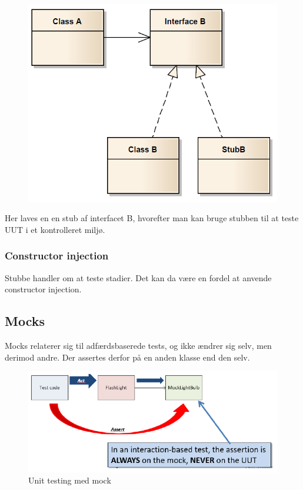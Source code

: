 \begin{figure}[H]
	\centering
	\includegraphics[width=0.7\linewidth]{figs/stubInterface.PNG}
	\caption{}
	\label{fig:stubInterface}
\end{figure}

Her laves en en stub af interfacet B, hvorefter man kan bruge stubben til at teste UUT i et kontrolleret miljø.

\subsubsection{Constructor injection}
Stubbe handler om at teste stadier. Det kan da være en fordel at anvende constructor injection.



\subsection{Mocks}
Mocks relaterer sig til adfærdsbaserede tests, og ikke ændrer sig selv, men derimod andre. Der assertes derfor på en anden klasse end den selv.

\begin{figure}[H]
\centering
\includegraphics[width=0.7\linewidth]{figs/mockTest.PNG}
\caption{Unit testing med mock}
\label{fig:mockTest}
\end{figure}

